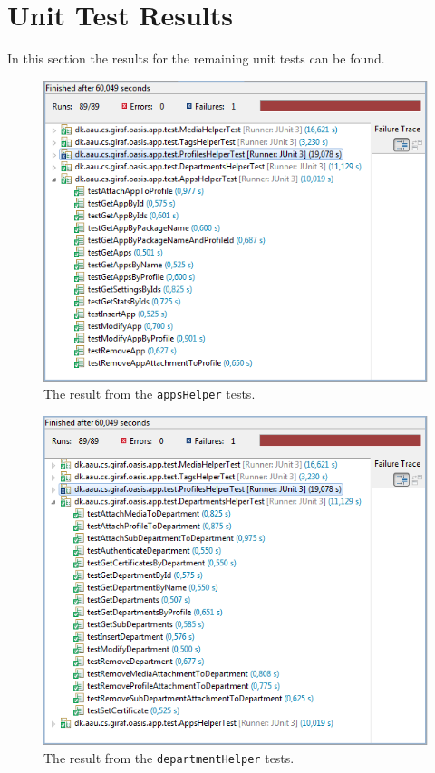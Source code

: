 \section{Unit Test Results}
\label{app:unitTestResults}
In this section the results for the remaining unit tests can be found.

\begin{figure}[H]
	\centering
		\includegraphics[width=\textwidth]{Images/unit_testing/app_helper_tests.PNG}
	\caption{The result from the \texttt{appsHelper} tests.}
	\label{fig:app_helper_tests}
\end{figure}

\begin{figure}[H]
	\centering
		\includegraphics[width=\textwidth]{Images/unit_testing/department_helper_tests.PNG}
	\caption{The result from the \texttt{departmentHelper} tests.}
	\label{fig:department_helper_tests}
\end{figure}

